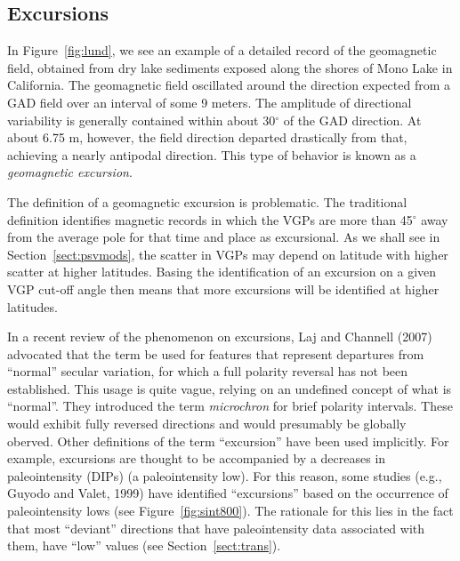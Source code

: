 \subsection{Excursions}

 In Figure~\ref{fig:lund}, we see an example of a detailed record of the geomagnetic field, obtained from dry lake sediments exposed along the shores of Mono Lake in California.     The geomagnetic field oscillated 
 around the  direction expected from a GAD field 
over an interval of some 9 meters.   The amplitude of directional variability is generally contained within about  30$^{\circ}$ of the GAD direction.     At  about 6.75 m, however, the  
field  direction departed drastically from that, achieving a nearly antipodal direction.    This type of behavior is known as a 
{\it geomagnetic excursion}.



  The definition of a geomagnetic excursion is problematic.   The traditional definition identifies magnetic records in which the VGPs are more than 45$^{\circ}$ away from the average pole for that time and place as excursional.      As we shall see in  Section~\ref{sect:psvmods}, the scatter in VGPs may depend on latitude with higher scatter at higher latitudes.         Basing the identification of an excursion on a given VGP cut-off angle then means that more excursions will be identified at higher latitudes.    
  
  
    In a recent review of the phenomenon on excursions,
  \nocite{laj07} 
Laj and Channell (2007)  advocated that the term be used for features
that represent departures from ``normal'' secular variation,
for which a full polarity reversal has not been
established.  This usage is quite vague, relying on an undefined concept  of what is ``normal''.   They introduced the term {\it microchron} for brief polarity intervals.  These would exhibit fully reversed directions and would presumably be globally oberved.    Other definitions of the term ``excursion'' have been used implicitly.  For example, 
excursions are thought to be accompanied by a decreases in paleointensity (DIPs) (a paleointensity low).   For this reason, some studies (e.g., 
Guyodo and Valet, 1999) \nocite{guyodo99}  have  identified ``excursions'' based on the occurrence  of paleointensity lows (see Figure~\ref{fig:sint800}).    The rationale for this lies in the fact that most ``deviant'' directions that have paleointensity data associated with them, have ``low'' values (see Section~\ref{sect:trans}).     

